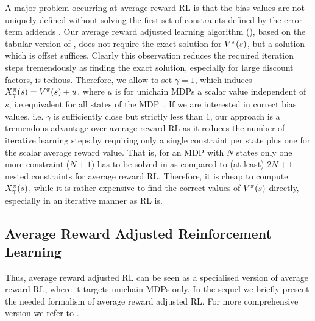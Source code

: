 \documentclass[envcountsame]{llncs}
\begin{document}
A major problem occurring at average reward RL is that the bias values are not uniquely defined
without solving the first set of constraints defined by the error term addends
\citep[see][p.346]{Puterman94,Mahadevan96_SensitiveDiscountOptimalityUnifyingDiscountedAndAverageRewardReinforcementLearning}.
%
Our average reward adjusted learning algorithm (\ARA{}), based on the tabular version of
\citet{schneckenreither2020average}, does not require the exact solution for \(V^{\pi}(s)\), but a
solution which is offset suffices. Clearly this observation reduces the required iteration steps
tremendously as finding the exact solution, especially for large discount factors, is tedious.
Therefore, we allow to set \(\gamma = 1\), which induces
\(X_{\gamma}^{\pi}(s) = V^{\pi}(s) + u\), where \(u\) is for unichain MDPs a scalar value
independent of \(s\), i.e.\@ equivalent for all states of the MDP~\cite[p.346]{Puterman94}.
%
%
If we are interested in correct bias values, i.e. \(\gamma\) is sufficiently close but strictly less
than \(1\), our approach is a tremendous advantage over average reward RL as it reduces the number
of iterative learning steps by requiring only a single constraint per state plus one for the scalar
average reward value. That is, for an MDP with \(N\) states only one more constraint (\(N+1)\) has
to be solved in \ARA{} as compared to (at least) \(2N+1\) nested constraints for average reward RL.
Therefore, it is cheap to compute \(X_{\gamma}^{\pi}(s)\), while it is rather expensive to find
the correct values of \(V^{\pi}(s)\) directly, especially in an iterative manner as RL is.

\subsection{Average Reward Adjusted Reinforcement Learning}
\label{subsec:Average_Reward_Adjusted_Reinforcement_Learning}

Thus, average reward adjusted RL can be seen as a specialised version of average reward RL, where it
targets unichain MDPs only. In the sequel we briefly present the needed formalism of average reward
adjusted RL. For more comprehensive version we refer to \citet{schneckenreither2020average}.
\end{document}
